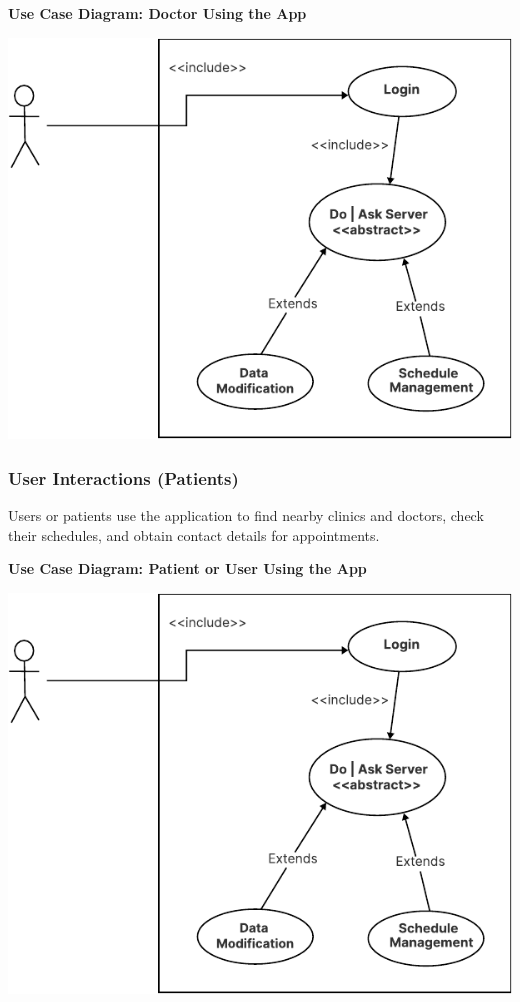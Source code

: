 \documentclass[12pt]{report}
\begin{document}
\vspace{0.5cm}  
\noindent \textbf{Use Case Diagram: Doctor Using the App}  
\begin{center}
    \includegraphics[width=\textwidth]{images/doctorCAS.pdf} %
\end{center}

\subsubsection{\textbf{User Interactions (Patients)}}  
Users or patients use the application to find nearby clinics and doctors, check their schedules, and obtain contact details for appointments.  

\vspace{0.5cm}  
\noindent \textbf{Use Case Diagram: Patient or User Using the App}  
\begin{center}
    \includegraphics[width=\textwidth]{images/doctorCAS.pdf} %
\end{center}
\end{document}
